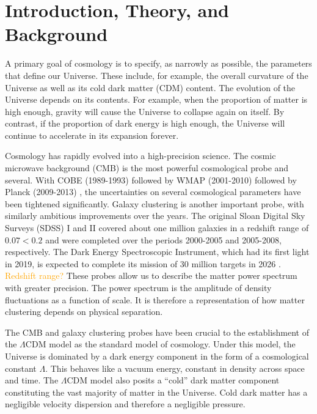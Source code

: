 \chapter{Introduction, Theory, and Background}


A primary goal of cosmology is to specify, as narrowly as possible, the 
parameters that define our Universe. These include, for example, the overall 
curvature of the Universe as well as its cold dark matter (CDM) content. The 
evolution of the Universe depends on its contents. For example, when the 
proportion of matter is high enough,
gravity will cause the Universe to collapse again on itself. By contrast, if
the proportion of dark energy is high enough, the Universe will continue to
accelerate in its expansion forever.

Cosmology has rapidly evolved into a high-precision science. The cosmic
microwave background (CMB) is the most powerful cosmological probe and
several. With
COBE (1989-1993)  followed by WMAP (2001-2010)  followed 
by Planck (2009-2013) , the uncertainties on several cosmological 
parameters have been tightened significantly.
Galaxy clustering is another important probe, with similarly ambitious
improvements over the years. The original Sloan Digital Sky Surveys (SDSS) I
and II covered about one million galaxies in a redshift range of $0.07 < 0.2$
and were completed over the periods 2000-2005 and 2005-2008, respectively.
The Dark Energy Spectroscopic Instrument, which had its first light in 2019, is expected to complete its mission of 30 million targets in 2026
. \textcolor{orange}{Redshift range?}
These probes allow us to describe the matter power spectrum
with greater precision. The power spectrum is the amplitude of density
fluctuations as a function of scale. It is therefore a representation of how
matter clustering depends on physical separation.

The CMB and galaxy clustering probes have been crucial to the establishment
of the $\Lambda$CDM model as the standard model of cosmology. Under this
model, the Universe is dominated by a dark energy component in the form of a
cosmological constant $\Lambda$. This behaves like a vacuum energy, constant
in density across space and time. The $\Lambda$CDM model also posits a 
``cold'' dark
matter component constituting the vast majority of matter in the Universe. 
Cold dark matter has a negligible velocity dispersion and therefore a
negligible pressure.

